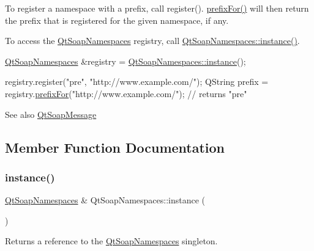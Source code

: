 To register a namespace with a prefix, call register(). \mbox{\hyperlink{class_qt_soap_namespaces_a745c4bc78333d1ee9d0c01efc38c5937}{prefix\+For()}} will then return the prefix that is registered for the given namespace, if any.

To access the \mbox{\hyperlink{class_qt_soap_namespaces}{Qt\+Soap\+Namespaces}} registry, call \mbox{\hyperlink{class_qt_soap_namespaces_ab859916f047d88209d505942232d99f5}{Qt\+Soap\+Namespaces\+::instance()}}.


\begin{DoxyCode}
\mbox{\hyperlink{class_qt_soap_namespaces}{QtSoapNamespaces}} &registry = \mbox{\hyperlink{class_qt_soap_namespaces_ab859916f047d88209d505942232d99f5}{QtSoapNamespaces::instance}}();

registry.register(\textcolor{stringliteral}{"pre"}, \textcolor{stringliteral}{"http://www.example.com/"});
QString prefix = registry.\mbox{\hyperlink{class_qt_soap_namespaces_a745c4bc78333d1ee9d0c01efc38c5937}{prefixFor}}(\textcolor{stringliteral}{"http://www.example.com/"}); \textcolor{comment}{// returns "pre"}
\end{DoxyCode}


\begin{DoxySeeAlso}{See also}
\mbox{\hyperlink{class_qt_soap_message}{Qt\+Soap\+Message}} 
\end{DoxySeeAlso}


\subsection{Member Function Documentation}
\mbox{\label{class_qt_soap_namespaces_ab859916f047d88209d505942232d99f5}} 
\subsubsection{\texorpdfstring{instance()}{instance()}}
{\footnotesize\ttfamily \mbox{\hyperlink{class_qt_soap_namespaces}{Qt\+Soap\+Namespaces}} \& Qt\+Soap\+Namespaces\+::instance (\begin{DoxyParamCaption}{ }\end{DoxyParamCaption})\hspace{0.3cm}{\ttfamily [static]}}

Returns a reference to the \mbox{\hyperlink{class_qt_soap_namespaces}{Qt\+Soap\+Namespaces}} singleton. \mbox{\label{class_qt_soap_namespaces_a745c4bc78333d1ee9d0c01efc38c5937}} 
